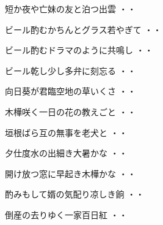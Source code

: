 \vspace{0.6cm}
\begin{shiika}短か夜や亡妹の友と泊つ出雲
\hfill{・・}\end{shiika}
\vspace{0.6cm}
\begin{shiika}ビール酌むかちんとグラス若やぎて
\hfill{・・}\end{shiika}
\vspace{0.6cm}
\begin{shiika}ビール酌むドラマのように共鳴し
\hfill{・・}\end{shiika}
\vspace{0.6cm}
\begin{shiika}ビール乾し少し多弁に刻忘る
\hfill{・・}\end{shiika}
\vspace{0.6cm}
\begin{shiika}向日葵が君臨空地の草いくさ
\hfill{・・}\end{shiika}
\vspace{0.6cm}
\begin{shiika}木樺咲く一日の花の教えごと
\hfill{・・}\end{shiika}
\vspace{0.6cm}
\begin{shiika}垣根ばら互の無事を老犬と
\hfill{・・}\end{shiika}
\vspace{0.6cm}
\begin{shiika}夕仕度水の出細き大暑かな
\hfill{・・}\end{shiika}
\vspace{0.6cm}
\begin{shiika}開け放つ窓に早起き木樺かな
\hfill{・・}\end{shiika}
\vspace{0.6cm}
\begin{shiika}酌みもして婿の気配り凉しき餉
\hfill{・・}\end{shiika}
\vspace{0.6cm}
\begin{shiika}倒産の去りゆく一家百日紅
\hfill{・・}\end{shiika}
